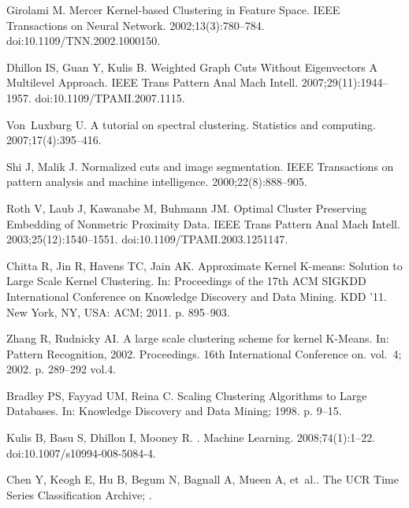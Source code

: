 \documentclass[10pt,letterpaper]{article}
\begin{document}
\begin{thebibliography}{10}
  Girolami M.
  \newblock Mercer Kernel-based Clustering in Feature Space.
  \newblock IEEE Transactions on Neural Network. 2002;13(3):780--784.
  \newblock doi:{10.1109/TNN.2002.1000150}.

  Dhillon IS, Guan Y, Kulis B.
  \newblock Weighted Graph Cuts Without Eigenvectors A Multilevel Approach.
  \newblock IEEE Trans Pattern Anal Mach Intell. 2007;29(11):1944--1957.
  \newblock doi:{10.1109/TPAMI.2007.1115}.

  Von~Luxburg U.
  \newblock A tutorial on spectral clustering.
  \newblock Statistics and computing. 2007;17(4):395--416.

  Shi J, Malik J.
  \newblock Normalized cuts and image segmentation.
  \newblock IEEE Transactions on pattern analysis and machine intelligence.
    2000;22(8):888--905.

  Roth V, Laub J, Kawanabe M, Buhmann JM.
  \newblock Optimal Cluster Preserving Embedding of Nonmetric Proximity Data.
  \newblock IEEE Trans Pattern Anal Mach Intell. 2003;25(12):1540--1551.
  \newblock doi:{10.1109/TPAMI.2003.1251147}.

  Chitta R, Jin R, Havens TC, Jain AK.
  \newblock Approximate Kernel K-means: Solution to Large Scale Kernel
    Clustering.
  \newblock In: Proceedings of the 17th ACM SIGKDD International Conference on
    Knowledge Discovery and Data Mining. KDD '11. New York, NY, USA: ACM; 2011.
    p. 895--903.

  Zhang R, Rudnicky AI.
  \newblock A large scale clustering scheme for kernel K-Means.
  \newblock In: Pattern Recognition, 2002. Proceedings. 16th International
    Conference on. vol.~4; 2002. p. 289--292 vol.4.

  Bradley PS, Fayyad UM, Reina C.
  \newblock Scaling Clustering Algorithms to Large Databases.
  \newblock In: Knowledge Discovery and Data Mining; 1998. p. 9--15.

  Kulis B, Basu S, Dhillon I, Mooney R.
  .
  \newblock Machine Learning. 2008;74(1):1--22.
  \newblock doi:{10.1007/s10994-008-5084-4}.

  Chen Y, Keogh E, Hu B, Begum N, Bagnall A, Mueen A, et~al..
  \newblock The UCR Time Series Classification Archive;
  .


\end{thebibliography}
\end{document}
